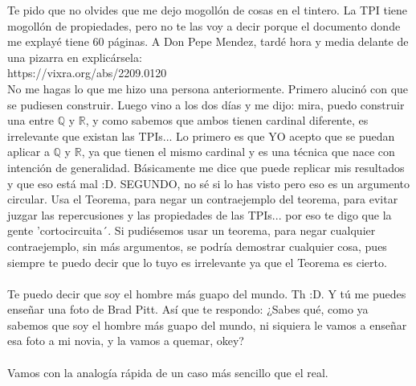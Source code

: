 	\noindent
	Te pido que no olvides que me dejo mogollón de cosas en el tintero. La TPI tiene mogollón de propiedades, pero no te las voy a decir porque el documento donde me explayé tiene 60 páginas. A Don Pepe Mendez, tardé hora y media delante de una pizarra en explicársela:\\
	https://vixra.org/abs/2209.0120\\
	No me hagas lo que me hizo una persona anteriormente. Primero alucinó con que se pudiesen construir. Luego vino a los dos días y me dijo: mira, puedo construir una entre $\mathbb{Q}$ y $\mathbb{R}$, y como sabemos que ambos tienen cardinal diferente, es irrelevante que existan las TPIs... Lo primero es que YO acepto que se puedan aplicar a $\mathbb{Q}$ y $\mathbb{R}$, ya que tienen el mismo cardinal y es una técnica que nace con intención de generalidad. Básicamente me dice que puede replicar mis resultados y que eso está mal :D. SEGUNDO, no sé si lo has visto pero eso es un argumento circular. Usa el Teorema, para negar un contraejemplo del teorema, para evitar juzgar las repercusiones y las propiedades de las TPIs... por eso te digo que la gente 'cortocircuita´. Si pudiésemos usar un teorema, para negar cualquier contraejemplo, sin más argumentos, se podría demostrar cualquier cosa, pues siempre te puedo decir que lo tuyo es irrelevante ya que el Teorema es cierto.\\\\
	
	\noindent
	Te puedo decir que soy el hombre más guapo del mundo. Th :D. Y tú me puedes enseñar una foto de Brad Pitt. Así que te respondo: ¿Sabes qué, como ya sabemos que soy el hombre más guapo del mundo, ni siquiera le vamos a enseñar esa foto a mi novia, y la vamos a quemar, okey?\\\\
	
	\noindent
	Vamos con la analogía rápida de un caso más sencillo que el real.
	
	